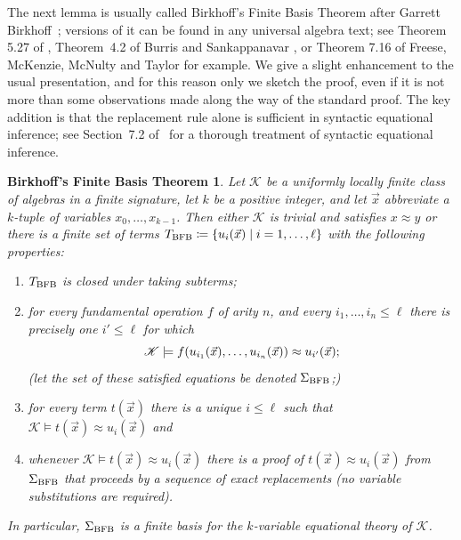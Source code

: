 \documentclass[reqno]{amsart}
\theoremstyle{plain}
\newtheorem{BFBT}[thm]{Birkhoff's Finite Basis Theorem}
\theoremstyle{definition}
\newcommand{\up}[1]{\textup{#1}}
\begin{document}
The next lemma is usually called Birkhoff's Finite Basis Theorem after Garrett Birkhoff~\cite{bir}; versions of it can be found in any universal algebra text; see Theorem 5.27 of \cite{ber}, Theorem~4.2 of Burris and Sankappanavar \cite{bursan}, or Theorem 7.16 of Freese, McKenzie, McNulty and Taylor \cite{ALV} for example.   We give a slight enhancement to the usual presentation, and for this reason only we sketch the proof, even if it is not more than some observations made along the way of the standard proof.  The key addition is that the replacement rule alone is sufficient in syntactic equational inference; see Section~7.2 of~\cite{ALV} for a thorough treatment of syntactic equational inference.
\begin{BFBT}\label{BFBT}
Let $\mathscr{K}$ be a uniformly locally finite class of algebras in a finite signature, let $k$ be a positive integer, and let $\vec{x}$ abbreviate a $k$-tuple of variables $x_0,\dots,x_{k-1}$.  Then  either $\mathscr{K}$ is trivial and satisfies $x\approx y$ or there is a finite set of terms 
$
T_{\rm BFB}\coloneqq \{u_i(\vec{x})\mid i=1,\dots,\ell\}
$
with the following properties\up:
 \begin{enumerate}
 \item $T_{\rm BFB}$ is closed under taking subterms\up;
 \item for every fundamental operation $f$ of arity $n$, and every $i_1,\dots,i_n\leq 
 \ell$ there is precisely one $i'\leq\ell$ for which 
 \[
 \mathscr{K}\models f(u_{i_1}(\vec{x}),\dots,u_{i_n}(\vec{x}))\approx u_{i'}(\vec{x})\up;
 \]
\up(let the set of these satisfied equations be denoted $\Sigma_{\rm BFB}$\up;\up)
  \item for every term $t(\vec{x})$ there is a unique $i\leq \ell$ such that $\mathscr{K}\models t(\vec{x})\approx u_{i}(\vec{x})$ and 
  \item whenever $\mathscr{K}\models t(\vec{x})\approx u_{i}(\vec{x})$ there is a proof of $t(\vec{x})\approx u_{i}(\vec{x})$ from $\Sigma_{\rm BFB}$ that proceeds by a sequence of exact replacements \up(no variable substitutions are required\up).
 \end{enumerate}
 In particular, $\Sigma_{\rm BFB}$ is a finite basis for the $k$-variable equational theory of $\mathscr{K}$.
\end{BFBT}
\end{document}
